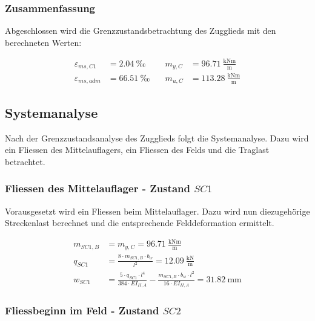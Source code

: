 \documentclass[
  11pt,
  letterpaper,
]{scrreprt}
\begin{document}
\subsubsection{Zusammenfassung}\label{zusammenfassung-3}

Abgeschlossen wird die Grenzzustandsbetrachtung des Zugglieds mit den
berechneten Werten:

\[
\begin{aligned}
\varepsilon_{m s , C1}& = 2.04 \ \mathrm{‰} \quad & m_{y , C}& = 96.71 \ \frac{\mathrm{kNm}}{\mathrm{m}} \\ 
\varepsilon_{m s , adm}& = 66.51 \ \mathrm{‰} \quad & m_{u , C}& = 113.28 \ \frac{\mathrm{kNm}}{\mathrm{m}} \end{aligned}
\]

\subsection{Systemanalyse}\label{systemanalyse-1}

Nach der Grenzzustandsanalyse des Zugglieds folgt die Systemanalyse.
Dazu wird ein Fliessen des Mittelauflagers, ein Fliessen des Felds und
die Traglast betrachtet.

\subsubsection{\texorpdfstring{Fliessen des Mittelauflager - Zustand
\(SC1\)}{Fliessen des Mittelauflager - Zustand SC1}}\label{fliessen-des-mittelauflager---zustand-sc1}

Vorausgesetzt wird ein Fliessen beim Mittelauflager. Dazu wird nun
diezugehörige Streckenlast berechnet und die entsprechende
Felddeformation ermittelt.

\[
\begin{aligned}
m_{SC1 , B}& = m_{y , C} = 96.71 \ \frac{\mathrm{kNm}}{\mathrm{m}} \\ 
q_{SC1}& = \frac{8 \cdot m_{SC1 , B} \cdot b_{w}}{l^{2}} = 12.09 \ \frac{\mathrm{kN}}{\mathrm{m}} \\ 
w_{SC1}& = \frac{5 \cdot q_{SC1} \cdot l^{4}}{384 \cdot EI_{II , A}} - \frac{m_{SC1 , B} \cdot b_{w} \cdot l^{2}}{16 \cdot EI_{II , A}} = 31.82 \ \mathrm{mm} \end{aligned}
\]

\subsubsection{\texorpdfstring{Fliessbeginn im Feld - Zustand
\(SC2\)}{Fliessbeginn im Feld - Zustand SC2}}\label{fliessbeginn-im-feld---zustand-sc2}
\end{document}
